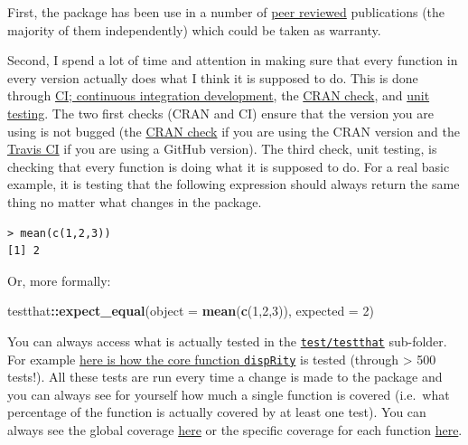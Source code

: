 \documentclass[]{book}
\newenvironment{Shaded}{\begin{snugshade}}{\end{snugshade}}
\newcommand{\DataTypeTok}[1]{\textcolor[rgb]{0.13,0.29,0.53}{#1}}
\newcommand{\DecValTok}[1]{\textcolor[rgb]{0.00,0.00,0.81}{#1}}
\newcommand{\KeywordTok}[1]{\textcolor[rgb]{0.13,0.29,0.53}{\textbf{#1}}}
\newcommand{\NormalTok}[1]{#1}
\newcommand{\OperatorTok}[1]{\textcolor[rgb]{0.81,0.36,0.00}{\textbf{#1}}}
\begin{document}
First, the package has been use in a number of \href{https://scholar.google.co.uk/scholar?oi=bibs\&hl=en\&cites=13311379491028410826,7753828186872068057}{peer reviewed} publications (the majority of them independently) which could be taken as warranty.

Second, I spend a lot of time and attention in making sure that every function in every version actually does what I think it is supposed to do.
This is done through \href{https://en.wikipedia.org/wiki/Continuous_integration}{CI; continuous integration development}, the \href{https://cran.r-project.org/web/checks/check_results_dispRity.html}{CRAN check}, and \href{https://en.wikipedia.org/wiki/Unit_testing}{unit testing}.
The two first checks (CRAN and CI) ensure that the version you are using is not bugged (the \href{https://cran.r-project.org/web/checks/check_results_dispRity.html}{CRAN check} if you are using the CRAN version and the \href{https://travis-ci.org/TGuillerme/dispRity}{Travis CI} if you are using a GitHub version).
The third check, unit testing, is checking that every function is doing what it is supposed to do. For a real basic example, it is testing that the following expression should always return the same thing no matter what changes in the package.

\begin{verbatim}
> mean(c(1,2,3))
[1] 2
\end{verbatim}

Or, more formally:

\begin{Shaded}
\begin{Highlighting}[]
\NormalTok{testthat}\OperatorTok{::}\KeywordTok{expect_equal}\NormalTok{(}\DataTypeTok{object =} \KeywordTok{mean}\NormalTok{(}\KeywordTok{c}\NormalTok{(}\DecValTok{1}\NormalTok{,}\DecValTok{2}\NormalTok{,}\DecValTok{3}\NormalTok{)),}
                       \DataTypeTok{expected =} \DecValTok{2}\NormalTok{)}
\end{Highlighting}
\end{Shaded}

You can always access what is actually tested in the \href{https://github.com/TGuillerme/dispRity/tree/master/tests/testthat}{\texttt{test/testthat}} sub-folder.
For example \href{https://github.com/TGuillerme/dispRity/blob/master/tests/testthat/test-dispRity.R}{here is how the core function \texttt{dispRity}} is tested (through \textgreater{} 500 tests!).
All these tests are run every time a change is made to the package and you can always see for yourself how much a single function is covered (i.e.~what percentage of the function is actually covered by at least one test).
You can always see the global coverage \href{https://app.codecov.io/gh/TGuillerme/dispRity}{here} or the specific coverage for each function \href{https://codecov.io/gh/TGuillerme/dispRity/tree/master/R}{here}.
\end{document}
